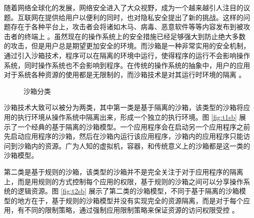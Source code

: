 \documentclass[final,12pt]{elsarticle}
\begin{document}
随着网络全球化的发展，网络安全进入了大众视野，成为一个越来越引人注目的议题。互联网在提供给用户以便利的同时，也对隐私安全提出了新的挑战。这样的问题存在于各种平台上，攻击者会将诸如木马、病毒、恶意软件等等内容发布到被攻击者的终端上 \cite{miwa}。虽然现在的操作系统上的安全措施已经足够强大到防止绝大多数的攻击，但是用户总是期望更加安全的环境。而沙箱是一种非常实用的安全机制，通过引入沙箱技术，程序可以在隔离的环境中运行，使得程序的运行不会影响操作系统，同时操作系统也不会影响到程序。在传统的操作系统的抽象中，用户的应用对于系统各种资源的使用都是无限制的，而沙箱技术是对其运行时环境的隔离 \cite{sandbox}。

\begin{figure}
\centering
{}
\caption{沙箱分类}
\end{figure}

沙箱技术大致可以被分为两类，其中第一类是基于隔离的沙箱，该类型的沙箱将应用的执行环境从操作系统中隔离出来，形成一个独立的执行环境。图 \ref{fig:t1sb} 展示了一个经典的基于隔离的沙箱模型。一个应用程序会在启动另一个应用程序之前先启动应用程序的沙箱，然后在沙箱内运行该应用程序，沙箱内的应用程序只能访问到沙箱内的资源。广为人知的虚拟机，容器，和传统意义上的沙箱都是这一类的沙箱模型。

第二类是基于规则的沙箱，该类型的沙箱并不是完全关注于对于应用程序的隔离上，而是用规则的方式控制每个应用的权限，基于规则的沙箱之间可以分享操作系统的逻辑资源。图 \ref{fig:t2sb} 展示了第二类的沙箱模型，不同于基于隔离的沙箱模型的地方在于，基于规则的沙箱模型并没有实现完全的资源隔离，而是对于每个应用，有不同的限制策略，通过强制应用限制策略来保证资源的访问权限受控 \cite{schreuders}。
\end{document}
